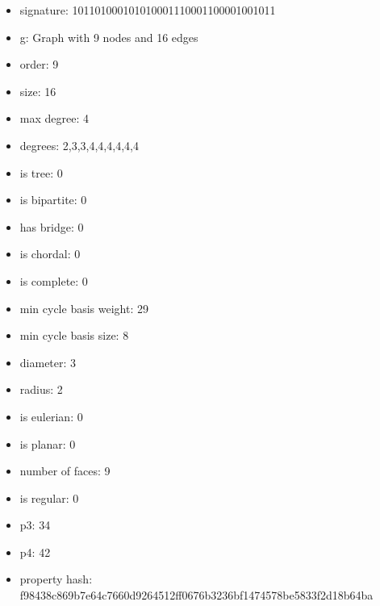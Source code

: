 \newpage
\begin{figure}
\end{figure}
\begin{itemize}
\item signature: 101101000101010001110001100001001011
\item g: Graph with 9 nodes and 16 edges
\item order: 9
\item size: 16
\item max degree: 4
\item degrees: 2,3,3,4,4,4,4,4,4
\item is tree: 0
\item is bipartite: 0
\item has bridge: 0
\item is chordal: 0
\item is complete: 0
\item min cycle basis weight: 29
\item min cycle basis size: 8
\item diameter: 3
\item radius: 2
\item is eulerian: 0
\item is planar: 0
\item number of faces: 9
\item is regular: 0
\item p3: 34
\item p4: 42
\item property hash: f98438c869b7e64c7660d9264512ff0676b3236bf1474578be5833f2d18b64ba
\end{itemize}
